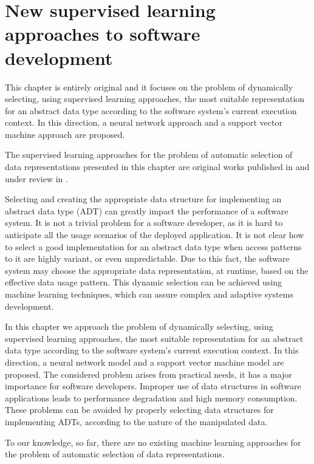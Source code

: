 \chapter[Supervised learning in software development]{New supervised learning approaches to software development}
\label{chap:dsselection}

This chapter is entirely original and it focuses on the problem of dynamically selecting, using supervised learning approaches, the most suitable representation for an abstract data type according to the software system's current execution context. In this direction, a neural network approach and a support vector machine approach are proposed. 

The supervised learning approaches for the problem of automatic selection of data representations presented  in this chapter are original works published in  \cite{Czibula11Intelligent} and under review in \cite{Czibula12SVM}.

Selecting and creating the appropriate data structure for implementing an abstract data type (ADT) can greatly impact the performance of a software system. It is not a trivial problem for a software developer, as it is hard to anticipate all the usage scenarios of the deployed application. It is not clear how to select a good implementation
for an abstract data type when access patterns to it are
highly variant, or even unpredictable. Due to this fact, the software system may choose the appropriate data representation, at runtime, based on the effective data usage pattern. This dynamic selection can be achieved using machine learning techniques, which can assure complex and adaptive systems development.

In this chapter we approach the problem of dynamically selecting, using supervised learning approaches, the most suitable representation for an abstract data type according to the software system's current execution context. In this direction, a neural network model and a support vector machine model are proposed. The considered problem arises from practical needs, it has a major importance for software developers. Improper use of data structures in software applications leads to performance degradation and high memory consumption. These problems can be avoided by properly selecting data structures for implementing ADTs, according to the nature of the manipulated data.

To our knowledge, so far, there are no existing machine learning approaches for the problem of automatic selection of data representations.

